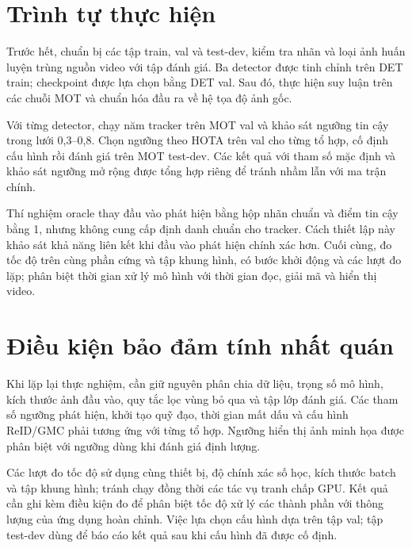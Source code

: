 \documentclass[fontsize=13pt,a4paper,oneside,parskip=false,numbers=noenddot,bibliography=totoc]{scrreprt}
\begin{document}
\section{Trình tự thực hiện}
Trước hết, chuẩn bị các tập train, val và test-dev, kiểm tra nhãn và loại ảnh huấn luyện trùng nguồn video với tập đánh giá. Ba detector được tinh chỉnh trên DET train; checkpoint được lựa chọn bằng DET val. Sau đó, thực hiện suy luận trên các chuỗi MOT và chuẩn hóa đầu ra về hệ tọa độ ảnh gốc.

Với từng detector, chạy năm tracker trên MOT val và khảo sát ngưỡng tin cậy trong lưới 0,3--0,8. Chọn ngưỡng theo HOTA trên val cho từng tổ hợp, cố định cấu hình rồi đánh giá trên MOT test-dev. Các kết quả với tham số mặc định và khảo sát ngưỡng mở rộng được tổng hợp riêng để tránh nhầm lẫn với ma trận chính.

Thí nghiệm oracle thay đầu vào phát hiện bằng hộp nhãn chuẩn và điểm tin cậy bằng 1, nhưng không cung cấp định danh chuẩn cho tracker. Cách thiết lập này khảo sát khả năng liên kết khi đầu vào phát hiện chính xác hơn. Cuối cùng, đo tốc độ trên cùng phần cứng và tập khung hình, có bước khởi động và các lượt đo lặp; phân biệt thời gian xử lý mô hình với thời gian đọc, giải mã và hiển thị video.

\section{Điều kiện bảo đảm tính nhất quán}
Khi lặp lại thực nghiệm, cần giữ nguyên phân chia dữ liệu, trọng số mô hình, kích thước ảnh đầu vào, quy tắc lọc vùng bỏ qua và tập lớp đánh giá. Các tham số ngưỡng phát hiện, khởi tạo quỹ đạo, thời gian mất dấu và cấu hình ReID/GMC phải tương ứng với từng tổ hợp. Ngưỡng hiển thị ảnh minh họa được phân biệt với ngưỡng dùng khi đánh giá định lượng.

Các lượt đo tốc độ sử dụng cùng thiết bị, độ chính xác số học, kích thước batch và tập khung hình; tránh chạy đồng thời các tác vụ tranh chấp GPU. Kết quả cần ghi kèm điều kiện đo để phân biệt tốc độ xử lý các thành phần với thông lượng của ứng dụng hoàn chỉnh. Việc lựa chọn cấu hình dựa trên tập val; tập test-dev dùng để báo cáo kết quả sau khi cấu hình đã được cố định.
\end{document}
